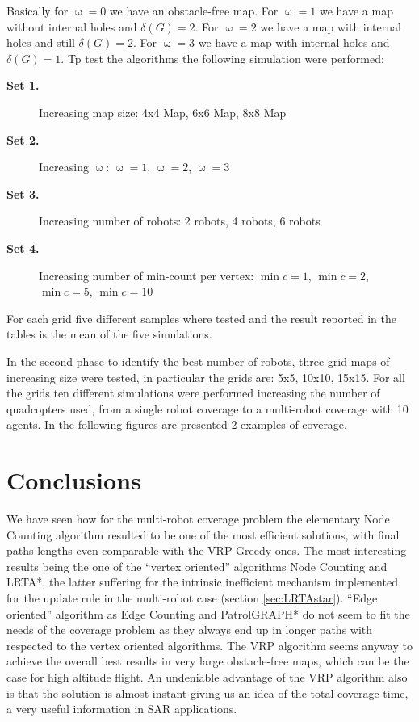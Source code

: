 Basically for $\upomega=0$ we have an obstacle-free map. For  $\upomega=1$ we have a map without internal holes and $\delta (G)=2$. For $\upomega=2$ we have a map with internal holes and still $\delta (G)=2$. For  $\upomega=3$ we have a map with internal holes and $\delta (G)=1$.
Tp test the algorithms the following simulation were performed:
\begin{description}
\item[\textbf{Set 1.}] Increasing map size: 4x4 Map, 6x6 Map, 8x8 Map
\item[\textbf{Set 2.}] Increasing $\upomega$:  $\upomega=1$, $\upomega=2$,  $\upomega=3$
\item[\textbf{Set 3.}] Increasing number of robots: 2 robots, 4 robots, 6 robots
\item[\textbf{Set 4.}] Increasing number of min-count per vertex: \mbox{$\min c=1$}, \mbox{$\min c =2$}, \mbox{$\min c =5$}, \mbox{$\min c =10$}
\end{description}

For each grid five different samples where tested and the result reported in the tables is the mean of the five simulations.

In the second phase to identify the best number of robots, three grid-maps of increasing size were tested, in particular the grids are: 5x5, 10x10, 15x15. For all the grids ten different simulations were performed increasing the number of quadcopters used, from a single robot coverage to a multi-robot coverage with 10 agents. In the following figures are presented 2 examples of coverage.





\pagebreak




\pagebreak


\section{Conclusions}
We have seen how for the multi-robot coverage problem the elementary Node Counting algorithm resulted to be one of the most efficient solutions, with final paths lengths even comparable with the VRP Greedy ones. The most interesting results being the one of the ``vertex oriented'' algorithms Node Counting and LRTA*, the latter suffering for the intrinsic inefficient mechanism implemented for the update rule in the multi-robot case (section \ref{sec:LRTAstar}). ``Edge oriented'' algorithm as Edge Counting and PatrolGRAPH* do not seem to fit the needs of the coverage problem as they always end up in longer paths with respected to the vertex oriented algorithms.
The VRP algorithm seems anyway to achieve the overall best results in very large obstacle-free maps, which can be the case for high altitude flight. An undeniable advantage of the VRP algorithm also is that the solution is almost instant giving us an idea of the total coverage time, a very useful information in SAR applications.


